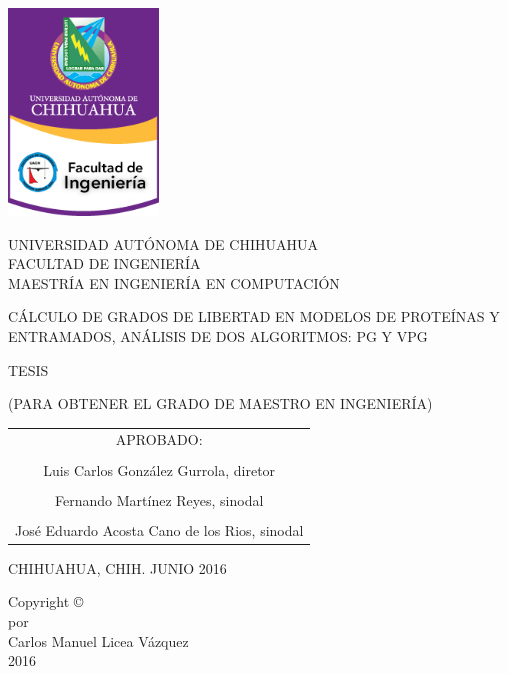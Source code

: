 \newpage


\begin{center}                
	\begin{minipage}{4cm}
  	\includegraphics[width=4cm]{images/uach}
	 \end{minipage}
  \hfill
	\begin{minipage}{10cm}
	  \centering
    UNIVERSIDAD AUTÓNOMA DE CHIHUAHUA \\[0.3\baselineskip]
  	FACULTAD DE INGENIERÍA \\[0.3\baselineskip]
  	MAESTRÍA EN INGENIERÍA EN COMPUTACIÓN
	\end{minipage}
			
	\vspace{1cm}

	\begin{doublespace}
		CÁLCULO DE GRADOS DE LIBERTAD EN MODELOS DE PROTEÍNAS Y ENTRAMADOS, ANÁLISIS DE DOS ALGORITMOS: PG Y VPG 
	\end{doublespace}

	\vspace{.5cm}

  TESIS
        
	\vspace{.5cm}

  (PARA OBTENER EL GRADO DE MAESTRO EN INGENIERÍA)
        
	\vspace{.7cm}

	\begin{minipage}{0.5\linewidth}
		\begin{tabular}{c}
			APROBADO: \\
			\\[.7cm] \hline
			Luis Carlos González Gurrola, diretor \\
			\\[.7cm] \hline
			Fernando Martínez Reyes, sinodal \\
			\\[.7cm] \hline
			José Eduardo Acosta Cano de los Rios, sinodal
		\end{tabular}
	\end{minipage}
        
  \vfill

  CHIHUAHUA, CHIH. \hfill JUNIO 2016      
\end{center}

\newpage

\begin{center}
\large

\vspace*{6cm}
Copyright © \\[1cm]
por \\
Carlos Manuel Licea  Vázquez\\
2016
\vfill
\end{center}

\newpage
\newpage
